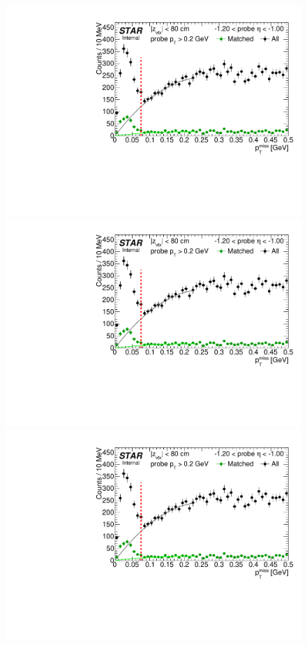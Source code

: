 \begin{figure}[ht]\ContinuedFloat
\centering
\parbox{0.495\textwidth}{
  \centering
  \includegraphics[width=\linewidth,page=7]{graphics/systematicsEfficiency/TOF_tagAndProbe/Fitting_effVsEta_data.pdf}\\
  \includegraphics[width=\linewidth,page=8]{graphics/systematicsEfficiency/TOF_tagAndProbe/Fitting_effVsEta_data.pdf}\\
  \includegraphics[width=\linewidth,page=9]{graphics/systematicsEfficiency/TOF_tagAndProbe/Fitting_effVsEta_data.pdf}\\
}
\end{figure}
